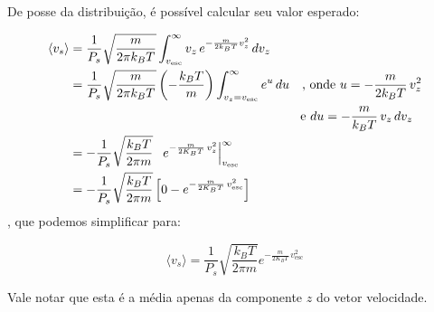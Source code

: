 \documentclass[12pt]{extarticle} %
\begin{document}
De posse da distribuição, é possível calcular seu valor esperado:

\begin{align}
    \langle v_s \rangle &= \frac{1}{P_s} \sqrt{\frac{m}{2\pi k_BT}}  \int_{v_\text{esc}}^{\infty} v_z \, e^{-\frac{m}{2k_BT}v_z^2} \, dv_z \notag \\
    &= \frac{1}{P_s} \sqrt{\frac{m}{2\pi k_BT}} \left(-\frac{k_BT}{m}\right) \int_{v_z=v_\text{esc}}^{\infty} e^u \, du\quad\text{, onde } u = -\frac{m}{2k_BT}\,v_z^2 \notag \\
    & \quad\quad\quad\quad\quad\quad\quad\quad\quad\quad\quad\quad\quad\quad\quad\quad\quad\quad \text{ e } du = -\frac{m}{k_BT} \, v_z \, dv_z \notag \\
    &= -\frac{1}{P_s} \sqrt{\frac{k_BT}{2\pi m}} \, \, \, \left. e^{-\frac{m}{2K_BT}\,v_z^2} \right|_{v_\text{esc}}^\infty \notag \\
    &= -\frac{1}{P_s} \sqrt{\frac{k_BT}{2\pi m}} \left[ 0 - e^{-\frac{m}{2K_BT}\,v_\text{esc}^2}\right] \notag
\end{align}
, que podemos simplificar para:

\begin{equation}
    \boxed{
        \, \, \langle v_s \rangle = \frac{1}{P_s} \sqrt{\frac{k_BT}{2\pi m}} e^{-\frac{m}{2K_BT}\,v_{\text{esc}}^2} \, \, 
    }
\end{equation}

Vale notar que esta é a média apenas da componente $z$ do vetor velocidade.
\end{document}
